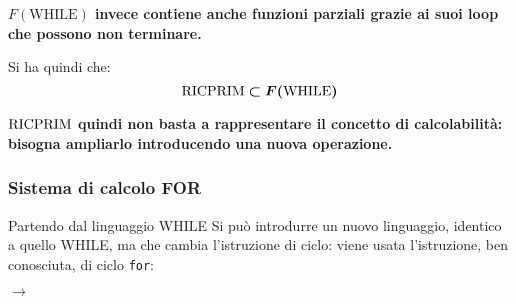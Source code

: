 \textbf{$F(\text{WHILE})$ invece contiene anche funzioni parziali grazie ai suoi loop che possono
non terminare.}

Si ha quindi che:
$$ \bm{\text{RICPRIM} \subset F(\text{WHILE})} $$

\textbf{$\text{RICPRIM}$ quindi non basta a rappresentare il concetto di calcolabilità: bisogna 
ampliarlo introducendo una nuova operazione.}

\subsubsection*{Sistema di calcolo FOR}
Partendo dal linguaggio WHILE Si può introdurre un nuovo linguaggio, identico a quello WHILE,
ma che cambia l'istruzione di ciclo: viene usata l'istruzione, ben conosciuta, di
ciclo \texttt{for}:

\begin{center}
\begin{minipage}{.43\textwidth}
\begin{tcolorbox}[colback=white,sharp corners,boxrule=.2mm]
\end{tcolorbox}
\end{minipage}
\begin{minipage}{.1\textwidth}
    \hspace{1.5em}$\to$
\end{minipage}
\begin{minipage}{.43\textwidth}
\begin{tcolorbox}[colback=white,sharp corners,boxrule=.2mm]
\end{tcolorbox}
\end{minipage}
\end{center}


